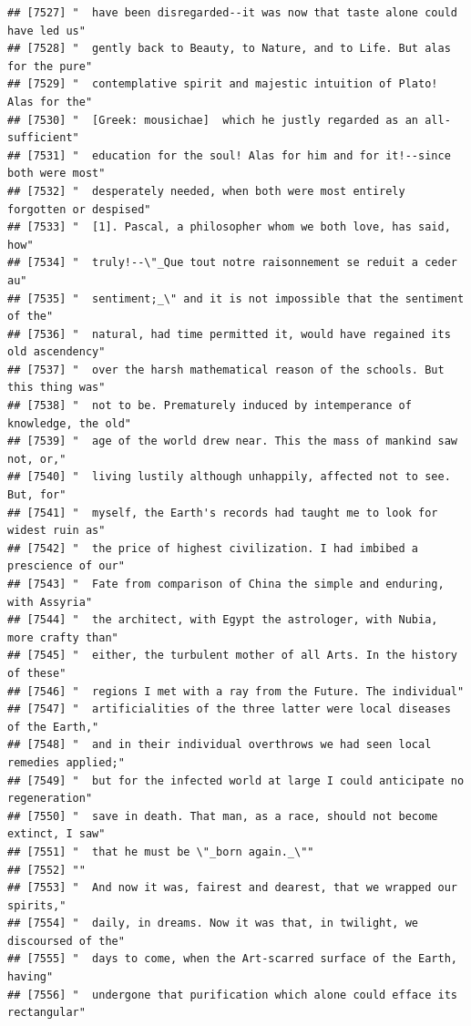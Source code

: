 \documentclass{article}\usepackage[]{graphicx}\usepackage[]{color}
\makeatletter
\newenvironment{kframe}{%
 \def\at@end@of@kframe{}%
 \ifinner\ifhmode%
  \def\at@end@of@kframe{\end{minipage}}%
  \begin{minipage}{\columnwidth}%
 \fi\fi%
 \def\FrameCommand##1{\hskip\@totalleftmargin \hskip-\fboxsep
 \colorbox{shadecolor}{##1}\hskip-\fboxsep
     \hskip-\linewidth \hskip-\@totalleftmargin \hskip\columnwidth}%
 \MakeFramed {\advance\hsize-\width
   \@totalleftmargin\z@ \linewidth\hsize
   \@setminipage}}%
 {\par\unskip\endMakeFramed%
 \at@end@of@kframe}
\newenvironment{knitrout}{}{} %
\makeatother
\begin{document}
\begin{knitrout}
\begin{kframe}
\begin{verbatim}
## [7527] "  have been disregarded--it was now that taste alone could have led us"      
## [7528] "  gently back to Beauty, to Nature, and to Life. But alas for the pure"      
## [7529] "  contemplative spirit and majestic intuition of Plato! Alas for the"        
## [7530] "  [Greek: mousichae]  which he justly regarded as an all-sufficient"         
## [7531] "  education for the soul! Alas for him and for it!--since both were most"    
## [7532] "  desperately needed, when both were most entirely forgotten or despised"    
## [7533] "  [1]. Pascal, a philosopher whom we both love, has said, how"               
## [7534] "  truly!--\"_Que tout notre raisonnement se reduit a ceder au"               
## [7535] "  sentiment;_\" and it is not impossible that the sentiment of the"          
## [7536] "  natural, had time permitted it, would have regained its old ascendency"    
## [7537] "  over the harsh mathematical reason of the schools. But this thing was"     
## [7538] "  not to be. Prematurely induced by intemperance of knowledge, the old"      
## [7539] "  age of the world drew near. This the mass of mankind saw not, or,"         
## [7540] "  living lustily although unhappily, affected not to see. But, for"          
## [7541] "  myself, the Earth's records had taught me to look for widest ruin as"      
## [7542] "  the price of highest civilization. I had imbibed a prescience of our"      
## [7543] "  Fate from comparison of China the simple and enduring, with Assyria"       
## [7544] "  the architect, with Egypt the astrologer, with Nubia, more crafty than"    
## [7545] "  either, the turbulent mother of all Arts. In the history of these"         
## [7546] "  regions I met with a ray from the Future. The individual"                  
## [7547] "  artificialities of the three latter were local diseases of the Earth,"     
## [7548] "  and in their individual overthrows we had seen local remedies applied;"    
## [7549] "  but for the infected world at large I could anticipate no regeneration"    
## [7550] "  save in death. That man, as a race, should not become extinct, I saw"      
## [7551] "  that he must be \"_born again._\""                                         
## [7552] ""                                                                            
## [7553] "  And now it was, fairest and dearest, that we wrapped our spirits,"         
## [7554] "  daily, in dreams. Now it was that, in twilight, we discoursed of the"      
## [7555] "  days to come, when the Art-scarred surface of the Earth, having"           
## [7556] "  undergone that purification which alone could efface its rectangular"      

\end{verbatim}
\end{kframe}
\end{knitrout}
\end{document}

